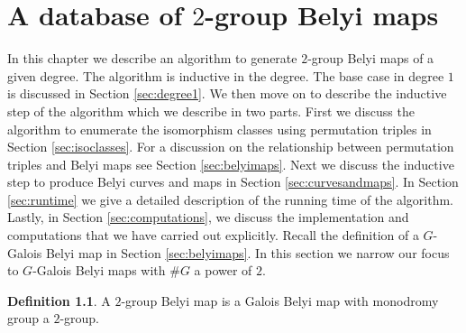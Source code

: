 \documentclass{dcthesis}
\newcommand{\defi}[1]{\textsf{#1}}
\numberwithin{equation}{section}
\theoremstyle{definition}
\newtheorem{definition}[equation]{Definition}
\theoremstyle{remark}
\begin{document}
\chapter{A database of $2$-group Belyi maps}{\label{chapter:database}
  In this chapter we describe an algorithm
  to generate $2$-group Belyi maps of a given degree.
  The algorithm is inductive in the degree.
  The base case in degree $1$ is discussed in Section \ref{sec:degree1}.
  We then move on to describe the inductive step of the algorithm
  which we describe in two parts.
  First we discuss the algorithm to enumerate the isomorphism classes
  using permutation triples in Section \ref{sec:isoclasses}.
  For a discussion on the relationship between permutation triples and Belyi maps
  see Section \ref{sec:belyimaps}.
  Next we discuss the inductive step to produce Belyi curves and maps in Section \ref{sec:curvesandmaps}.
  In Section \ref{sec:runtime} we give a detailed description of the running time of the algorithm.
  Lastly,
  in Section \ref{sec:computations},
  we discuss the implementation and computations that we have carried out explicitly.
  Recall the definition of a $G$-Galois Belyi map in Section \ref{sec:belyimaps}.
  In this section we narrow our focus
  to $G$-Galois Belyi maps with $\#G$ a power of $2$.
  \begin{definition}\label{def:2groupbelyi}
    A \defi{$2$-group Belyi map} is a Galois Belyi map
    with monodromy group a $2$-group.
  \end{definition}
}
\end{document}
